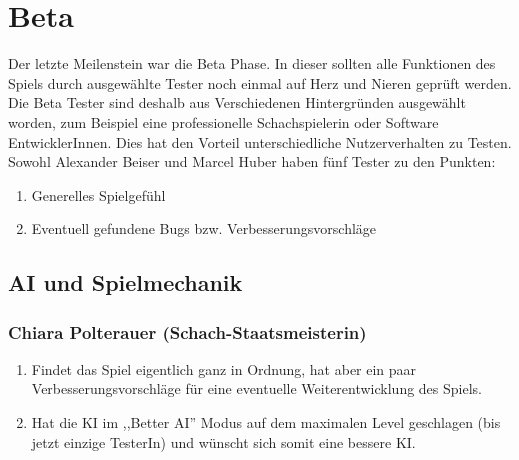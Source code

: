\documentclass[12pt,a4paper]{article}
\begin{document}
{\section{Beta}
\label{SEC:beta}

Der letzte Meilenstein war die Beta Phase. In dieser sollten alle Funktionen des Spiels durch ausgewählte Tester noch einmal auf Herz und Nieren geprüft werden. Die Beta Tester sind deshalb aus Verschiedenen Hintergründen ausgewählt worden, zum Beispiel eine professionelle Schachspielerin oder Software EntwicklerInnen. Dies hat den Vorteil unterschiedliche Nutzerverhalten zu Testen. \\[1ex]
Sowohl Alexander Beiser und Marcel Huber haben fünf Tester zu den Punkten:
\begin{enumerate}[I]
	\item{Generelles Spielgefühl}
	\item{Eventuell gefundene Bugs bzw. Verbesserungsvorschläge}
\end{enumerate}




\subsection{AI und Spielmechanik}
\label{SUBSEC:BETAGAME}


\subsubsection*{Chiara Polterauer (Schach-Staatsmeisterin)}
\begin{enumerate}[I]
	\item{Findet das Spiel eigentlich ganz in Ordnung, hat aber ein paar Verbesserungsvorschläge für eine eventuelle Weiterentwicklung des Spiels.}
	\item{Hat die KI im ,,Better AI'' Modus auf dem maximalen Level geschlagen (bis jetzt einzige TesterIn) und wünscht sich somit eine bessere KI. }
\end{enumerate}

}
\end{document}
